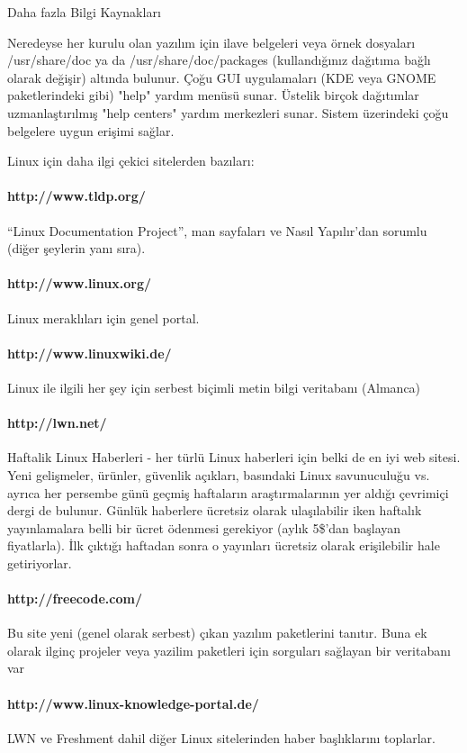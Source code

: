 \documentclass[10pt,a5paper]{book}
\begin{document}
\begin{section}{Daha fazla Bilgi Kaynakları}

Neredeyse her kurulu olan yazılım için ilave belgeleri veya örnek dosyaları /usr/share/doc ya da /usr/share/doc/packages (kullandığınız dağıtıma bağlı olarak değişir) altında bulunur. Çoğu GUI uygulamaları (KDE veya GNOME paketlerindeki gibi) "help" yardım menüsü sunar. Üstelik birçok dağıtımlar uzmanlaştırılmış "help centers" yardım merkezleri sunar. Sistem üzerindeki çoğu belgelere uygun erişimi sağlar.

Linux için daha ilgi çekici sitelerden bazıları:
\paragraph{http://www.tldp.org/}{“Linux Documentation Project”, man sayfaları ve Nasıl Yapılır'dan sorumlu (diğer şeylerin yanı sıra).}
\paragraph{http://www.linux.org/}{Linux meraklıları için genel portal.}
\paragraph{http://www.linuxwiki.de/}{Linux ile ilgili her şey için serbest biçimli metin bilgi veritabanı (Almanca)}
\paragraph{http://lwn.net/}{Haftalik Linux Haberleri - her türlü Linux haberleri için belki de en iyi web sitesi. Yeni gelişmeler, ürünler, güvenlik açıkları, basındaki Linux savunuculuğu vs. ayrıca her persembe günü geçmiş haftaların araştırmalarının yer aldığı çevrimiçi dergi de bulunur. Günlük haberlere ücretsiz olarak ulaşılabilir iken haftalık yayınlamalara belli bir ücret ödenmesi gerekiyor (aylık 5\$'dan başlayan fiyatlarla). İlk çıktığı haftadan sonra o yayınları ücretsiz olarak erişilebilir hale getiriyorlar.}
\paragraph{http://freecode.com/}{Bu site yeni (genel olarak serbest) çıkan yazılım paketlerini tanıtır. Buna ek olarak ilginç projeler veya yazilim paketleri için sorguları sağlayan bir veritabanı var}
\paragraph{http://www.linux-knowledge-portal.de/}{LWN ve Freshment dahil diğer Linux sitelerinden haber başlıklarını toplarlar.}


\end{section}
\end{document}
